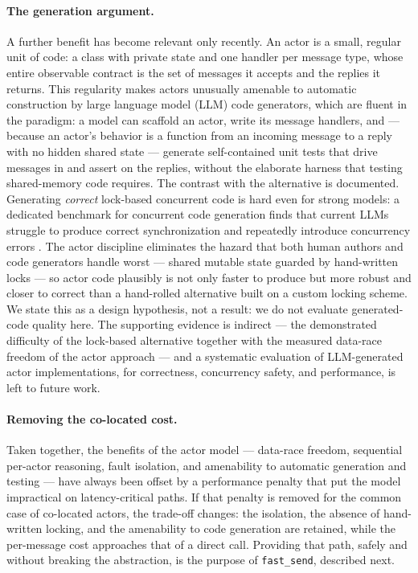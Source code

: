 \documentclass[11pt]{article}
\newcommand{\fs}{\texttt{fast\_send}}
\begin{document}
\paragraph{The generation argument.} A further benefit has become relevant only
recently. An actor
is a small, regular unit of code: a class with private state and one handler per
message type, whose entire observable contract is the set of messages it accepts
and the replies it returns. This regularity makes actors unusually amenable to
automatic construction by large language model (LLM) code generators, which are
fluent in the paradigm: a model can scaffold an actor, write its message
handlers, and --- because an actor's behavior is a function from an incoming
message to a reply with no hidden shared state --- generate self-contained unit
tests that drive messages in and assert on the replies, without the elaborate
harness that testing shared-memory code requires. The contrast with the
alternative is documented. Generating \emph{correct} lock-based
concurrent code is hard even for strong models: a dedicated benchmark for
concurrent code generation finds that current LLMs struggle to produce correct
synchronization and repeatedly introduce concurrency errors
\cite{concur2026}. The actor discipline eliminates the hazard that
both human authors and code generators handle worst --- shared mutable state
guarded by hand-written locks --- so actor code plausibly is not only faster to
produce but more robust and closer to correct than a hand-rolled alternative
built on a custom locking scheme. We state this as a design hypothesis, not a
result: we do not evaluate generated-code quality here. The supporting evidence
is indirect --- the demonstrated difficulty of the lock-based alternative
\cite{concur2026} together with the measured data-race freedom of the actor
approach \cite{tasharofi2013,bagherzadeh2020} --- and a systematic evaluation of
LLM-generated actor implementations, for correctness, concurrency safety, and
performance, is left to future work.

\paragraph{Removing the co-located cost.} Taken together, the
benefits of the actor model --- data-race freedom, sequential per-actor
reasoning, fault isolation, and amenability to automatic generation
and testing --- have always been offset by a performance penalty that put the
model impractical on latency-critical paths. If that penalty is removed for
the common case of co-located actors, the trade-off changes: the isolation, the
absence of hand-written locking, and the amenability to code generation are
retained, while the per-message cost approaches that of a direct call. Providing
that path, safely and without breaking the abstraction, is the purpose of \fs{},
described next.
\end{document}

